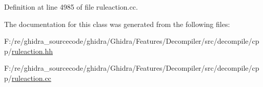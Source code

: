Definition at line 4985 of file ruleaction.\+cc.



The documentation for this class was generated from the following files\+:\begin{DoxyCompactItemize}
\item 
F\+:/re/ghidra\+\_\+sourcecode/ghidra/\+Ghidra/\+Features/\+Decompiler/src/decompile/cpp/\mbox{\hyperlink{ruleaction_8hh}{ruleaction.\+hh}}\item 
F\+:/re/ghidra\+\_\+sourcecode/ghidra/\+Ghidra/\+Features/\+Decompiler/src/decompile/cpp/\mbox{\hyperlink{ruleaction_8cc}{ruleaction.\+cc}}\end{DoxyCompactItemize}
